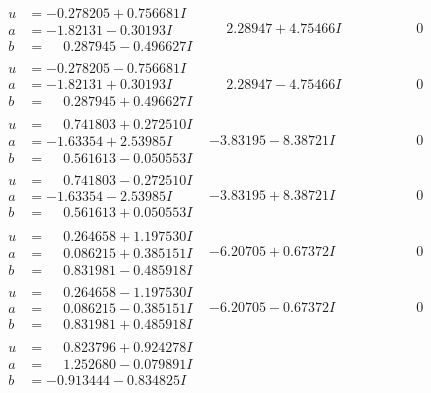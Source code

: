 \documentclass[1p]{elsarticle_modified}
\theoremstyle{definition}
\begin{document}
$$\begin{array}{c|c|c}
\begin{aligned}
u &= -0.278205 + 0.756681 I \\
a &= -1.82131 - 0.30193 I \\
b &= \phantom{-}0.287945 - 0.496627 I\end{aligned}
 & \phantom{-}2.28947 + 4.75466 I & \phantom{-0.000000 } 0 \\ \hline\begin{aligned}
u &= -0.278205 - 0.756681 I \\
a &= -1.82131 + 0.30193 I \\
b &= \phantom{-}0.287945 + 0.496627 I\end{aligned}
 & \phantom{-}2.28947 - 4.75466 I & \phantom{-0.000000 } 0 \\ \hline\begin{aligned}
u &= \phantom{-}0.741803 + 0.272510 I \\
a &= -1.63354 + 2.53985 I \\
b &= \phantom{-}0.561613 - 0.050553 I\end{aligned}
 & -3.83195 - 8.38721 I & \phantom{-0.000000 } 0 \\ \hline\begin{aligned}
u &= \phantom{-}0.741803 - 0.272510 I \\
a &= -1.63354 - 2.53985 I \\
b &= \phantom{-}0.561613 + 0.050553 I\end{aligned}
 & -3.83195 + 8.38721 I & \phantom{-0.000000 } 0 \\ \hline\begin{aligned}
u &= \phantom{-}0.264658 + 1.197530 I \\
a &= \phantom{-}0.086215 + 0.385151 I \\
b &= \phantom{-}0.831981 - 0.485918 I\end{aligned}
 & -6.20705 + 0.67372 I & \phantom{-0.000000 } 0 \\ \hline\begin{aligned}
u &= \phantom{-}0.264658 - 1.197530 I \\
a &= \phantom{-}0.086215 - 0.385151 I \\
b &= \phantom{-}0.831981 + 0.485918 I\end{aligned}
 & -6.20705 - 0.67372 I & \phantom{-0.000000 } 0 \\ \hline\begin{aligned}
u &= \phantom{-}0.823796 + 0.924278 I \\
a &= \phantom{-}1.252680 - 0.079891 I \\
b &= -0.913444 - 0.834825 I\end{aligned}

\end{array}$$
\end{document}
